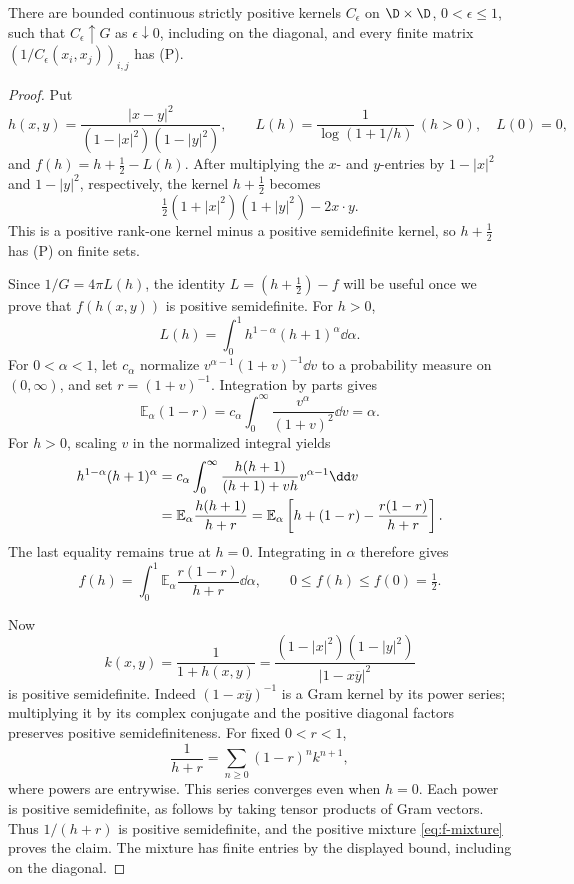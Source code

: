 \begin{lemma}\label{lem:regularization}
There are bounded continuous strictly positive kernels $C_\epsilon$ on $\D\times\D$, $0<\epsilon\le1$, such that $C_\epsilon\uparrow G$ as $\epsilon\downarrow0$, including on the diagonal, and every finite matrix $(1/C_\epsilon(x_i,x_j))_{i,j}$ has \textup{(P)}.
\end{lemma}
\begin{proof}
Put
\[
h(x,y)=\frac{|x-y|^2}{(1-|x|^2)(1-|y|^2)},\qquad
L(h)=\frac1{\log(1+1/h)}\ (h>0),\quad L(0)=0,
\]
and $f(h)=h+\tfrac12-L(h)$. After multiplying the $x$- and $y$-entries by $1-|x|^2$ and $1-|y|^2$, respectively, the kernel $h+\tfrac12$ becomes
\begin{equation}\label{eq:lorentz}
\tfrac12(1+|x|^2)(1+|y|^2)-2x\cdot y.
\end{equation}
This is a positive rank-one kernel minus a positive semidefinite kernel, so $h+\tfrac12$ has \textup{(P)} on finite sets.

Since $1/G=4\pi L(h)$, the identity $L=(h+\tfrac12)-f$ will be useful once we prove that $f(h(x,y))$ is positive semidefinite. For $h>0$,
\begin{equation}\label{eq:log-mean}
L(h)=\int_0^1h^{1-\alpha}(h+1)^\alpha\dd\alpha.
\end{equation}
For $0<\alpha<1$, let $c_\alpha$ normalize $v^{\alpha-1}(1+v)^{-1}\dd v$ to a probability measure on $(0,\infty)$, and set $r=(1+v)^{-1}$. Integration by parts gives
\[
\mathbb E_\alpha(1-r)
=c_\alpha\int_0^\infty\frac{v^\alpha}{(1+v)^2}\dd v
=\alpha.
\]
For $h>0$, scaling $v$ in the normalized integral yields
\begin{align}
h^{1-\alpha}(h+1)^\alpha
&=c_\alpha\int_0^\infty
\frac{h(h+1)}{(h+1)+vh}v^{\alpha-1}\dd v\notag\\
&=\mathbb E_\alpha\frac{h(h+1)}{h+r}
=\mathbb E_\alpha\left[h+(1-r)-\frac{r(1-r)}{h+r}\right].\label{eq:mixture-algebra}
\end{align}
The last equality remains true at $h=0$. Integrating in $\alpha$ therefore gives
\begin{equation}\label{eq:f-mixture}
f(h)=\int_0^1\mathbb E_\alpha\frac{r(1-r)}{h+r}\dd\alpha,
\qquad 0\le f(h)\le f(0)=\tfrac12.
\end{equation}

Now
\[
k(x,y)=\frac1{1+h(x,y)}
=\frac{(1-|x|^2)(1-|y|^2)}{|1-x\overline y|^2}
\]
is positive semidefinite. Indeed $(1-x\overline y)^{-1}$ is a Gram kernel by its power series; multiplying it by its complex conjugate and the positive diagonal factors preserves positive semidefiniteness. For fixed $0<r<1$,
\begin{equation}\label{eq:schur-geometric}
\frac1{h+r}=\sum_{n\ge0}(1-r)^n k^{n+1},
\end{equation}
where powers are entrywise. This series converges even when $h=0$. Each power is positive semidefinite, as follows by taking tensor products of Gram vectors. Thus $1/(h+r)$ is positive semidefinite, and the positive mixture \eqref{eq:f-mixture} proves the claim. The mixture has finite entries by the displayed bound, including on the diagonal.


\end{proof}
